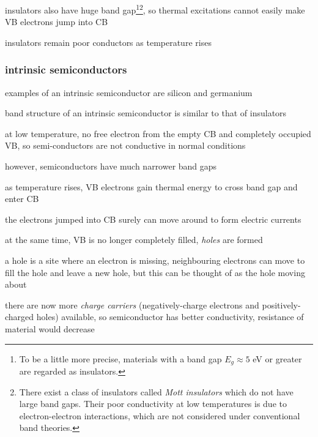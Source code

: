 insulators also have huge band gap\footnote{To be a little more precise, materials with a band gap $E_g \approx 5$ eV or greater are regarded as insulators.}\footnote{There exist a class of insulators called \emph{Mott insulators} which do not have large band gaps. Their poor conductivity at low temperatures is due to electron-electron interactions, which are not considered under conventional band theories.}, so thermal excitations cannot easily make VB electrons jump into CB

insulators remain poor conductors as temperature rises




\subsubsection*{intrinsic semiconductors}

examples of an intrinsic semiconductor are silicon and germanium

band structure of an intrinsic semiconductor is similar to that of insulators

at low temperature, no free electron from the empty CB and completely occupied VB, so semi-conductors are not conductive in normal conditions

however, semiconductors have much narrower band gaps

as temperature rises, VB electrons gain thermal energy to cross band gap and enter CB

the electrons jumped into CB surely can move around to form electric currents

at the same time, VB is no longer completely filled, \emph{holes} are formed

a hole is a site where an electron is missing, neighbouring electrons can move to fill the hole and leave a new hole, but this can be thought of as the hole moving about

there are now more \emph{charge carriers} (negatively-charge electrons and positively-charged holes) available, so semiconductor has better conductivity, resistance of material would decrease

